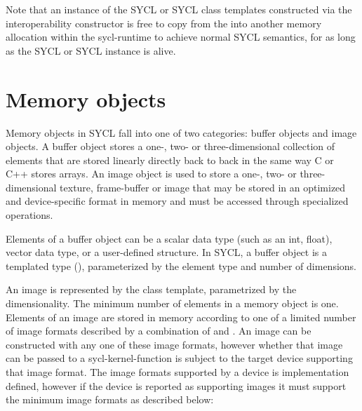 Note that an instance of the SYCL  or SYCL  class templates constructed via the interoperability constructor is free to copy from the  into another memory allocation within the \gls{sycl-runtime} to achieve normal SYCL semantics, for as long as the SYCL  or SYCL  instance is alive.

\section{Memory objects}

Memory objects in SYCL fall into one of two categories: \gls{buffer} objects
and \gls{image} objects. A buffer object stores a one-, two- or
three-dimensional collection of elements that are stored linearly directly back
to back in the same way C or C++ stores arrays. An image object is used to store
a one-, two- or three-dimensional texture, frame-buffer or image that may be
stored in an optimized and device-specific format in memory and must be accessed
through specialized operations.

Elements of a buffer object can be a scalar data type (such as an int, float),
vector data type, or a user-defined structure. In SYCL, a \gls{buffer} object is a
templated type (), parameterized by the element
type and number of dimensions.

An \gls{image} is represented by the  class
template, parametrized by the dimensionality. The minimum number of elements in
a memory object is one. Elements of an \gls{image} are stored in memory
according to one of a limited number of image formats described by a combination of
 and
. An \gls{image} can be constructed
with any one of these image formats, however whether that \gls{image} can be
passed to a \gls{sycl-kernel-function} is subject to the target \gls{device}
supporting that image format. The image formats supported by a \gls{device} is
implementation defined, however if the \gls{device} is reported as supporting
images it must support the minimum image formats as described below:

